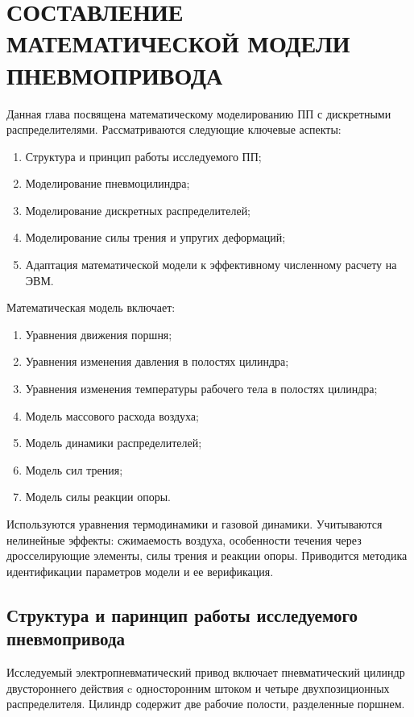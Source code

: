 \chapter{СОСТАВЛЕНИЕ МАТЕМАТИЧЕСКОЙ МОДЕЛИ ПНЕВМОПРИВОДА}\label{ch:ch2}
Данная глава посвящена математическому моделированию ПП
с дискретными распределителями. Рассматриваются следующие ключевые аспекты:

\begin{enumerate}
    \item Структура и принцип работы исследуемого ПП;
    \item Моделирование пневмоцилиндра;
    \item Моделирование дискретных распределителей;
    \item Моделирование силы трения и упругих деформаций;
    \item Адаптация математической модели к эффективному численному расчету на ЭВМ.
\end{enumerate}

Математическая модель включает:

\begin{enumerate}
    \item Уравнения движения поршня;
    \item Уравнения изменения давления в полостях цилиндра;
    \item Уравнения изменения температуры рабочего тела в полостях цилиндра;
    \item Модель массового расхода воздуха;
    \item Модель динамики распределителей;
    \item Модель сил трения;
    \item Модель силы реакции опоры.
\end{enumerate}

Используются уравнения термодинамики и газовой динамики. Учитываются нелинейные эффекты:
сжимаемость воздуха, особенности течения через дросселирующие элементы, силы трения и реакции опоры.
Приводится методика идентификации параметров модели и ее верификация.

\section{Структура и паринцип работы исследуемого пневмопривода}\label{sec:ch2/sec1}

Исследуемый электропневматический привод включает пневматический цилиндр двустороннего действия
c односторонним штоком и четыре двухпозиционных распределителя.
Цилиндр содержит две рабочие полости, разделенные поршнем.

